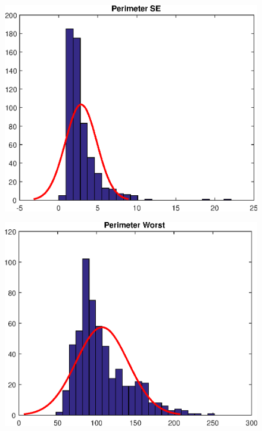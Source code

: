 \documentclass[11pt,a4paper]{article}
\numberwithin{equation}{section}
\begin{document}
\begin{itemize}
\begin{figure}[H]
\centering
\begin{minipage}{.5\textwidth}
  \centering
  \includegraphics[width=\linewidth]{./img/perimeter_se}
  \label{fig:test1}
\end{minipage}%
\begin{minipage}{.5\textwidth}
  \centering
  \includegraphics[width=\linewidth]{./img/perimeter_worst}
  \label{fig:test2}
\end{minipage}
\end{figure}


\end{itemize}
\end{document}
